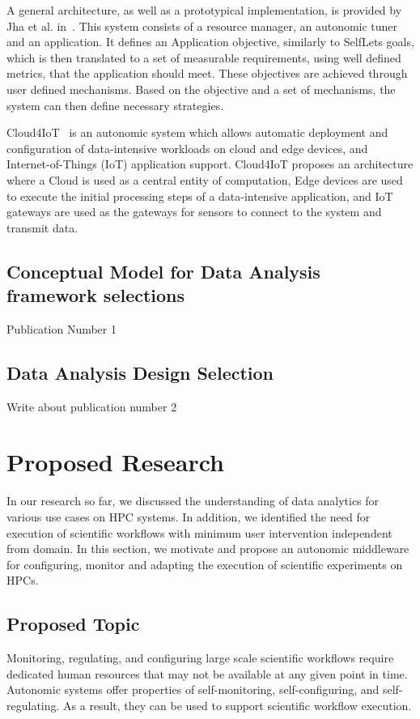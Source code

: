 A general architecture, as well as a prototypical implementation, is provided by Jha et al. in~\cite{jha2009self}. This system consists of a resource manager, an autonomic tuner and an application. It defines an Application objective, similarly to SelfLets goals, which is then translated to a set of measurable requirements, using well defined metrics, that the application should meet. These objectives are achieved through user defined mechanisms. Based on the objective and a set of mechanisms, the system can then define necessary strategies.

Cloud4IoT~\cite{pizzolli2016cloud4iot} is an autonomic system which allows automatic deployment and configuration of data-intensive workloads on cloud and edge devices, and Internet-of-Things (IoT) application support. Cloud4IoT proposes an architecture where a Cloud is used as a central entity of computation, Edge devices are used to execute the initial processing steps of a data-intensive application, and IoT gateways are used as the gateways for sensors to connect to the system and transmit data.

\subsection{Conceptual Model for Data Analysis framework selections}

Publication Number 1 ~\cite{paraskevakos2018task}

\subsection{Data Analysis Design Selection}

Write about publication number 2

\section{Proposed Research}

In our research so far, we discussed the understanding of data analytics for various use cases on HPC systems. In addition, we identified the need for execution of scientific workflows with minimum user intervention independent from domain. In this section, we motivate and propose an autonomic middleware for configuring, monitor and adapting the execution of scientific experiments on HPCs.

\subsection{Proposed Topic}
Monitoring, regulating, and configuring large scale scientific workflows require dedicated human resources that may not be available at any given point in time. Autonomic systems offer properties of self-monitoring, self-configuring, and self-regulating. As a result, they can be used to support scientific workflow execution.


